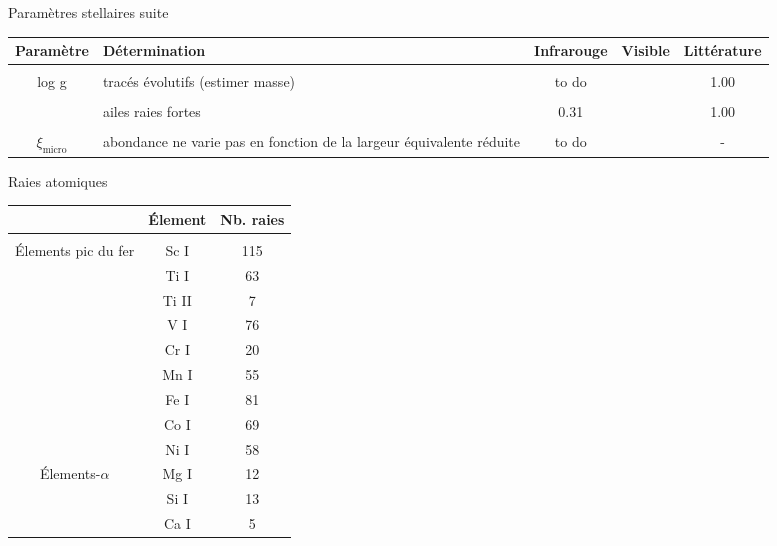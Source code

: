 \documentclass[10pt]{beamer}
\begin{document}
\begin{frame}[fragile]{Paramètres stellaires suite}
\begin{table}[h!]
    \begin{center}
        \begin{tabularx}{\textwidth}{c|X|c|c|c}
            Paramètre & Détermination & Infrarouge & Visible &Littérature \\
            \hline
            &&&\\
            log g & tracés évolutifs (estimer masse) & to do && 1.00 \\
            &&&\\
            & ailes raies fortes & 0.31 && 1.00 \\
             &&&\\
            $\xi_{\text{micro}}$ & abondance ne varie pas en fonction de la largeur équivalente réduite & to do && - \\
        \end{tabularx}
    \end{center}
\end{table}

\end{frame}

\begin{frame}[fragile]{Raies atomiques}

\begin{table}[h!]
    \begin{center}
        \begin{tabular}{c|c|c}
            & Élement & Nb. raies\\
            \hline
            &&\\
            Élements pic du fer & Sc I &115\\
             & Ti I&63\\
             & Ti II&7\\
             & V I&76\\
             & Cr I&20\\
             & Mn I&55\\
             &Fe I&81 \\
            & Co I&69\\
            & Ni I&58\\
            Élements-$\alpha$ & Mg I&12 \\
             & Si I&13 \\
             & Ca I& 5\\
        \end{tabular}
    \end{center}
\end{table}


\end{frame}
\end{document}
